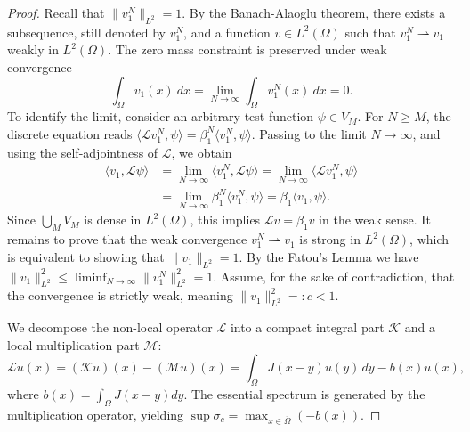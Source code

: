 \documentclass[11pt, a4paper]{article}
\theoremstyle{break}
\theoremstyle{break}
\theoremstyle{break}
\theoremstyle{break}
\theoremstyle{break}
\theoremstyle{break}
\theoremstyle{break}
\theoremstyle{break}
\theoremstyle{break}
\begin{document}
\begin{proof}
    Recall that $\|v_1^N\|_{L^2} = 1$. By the Banach-Alaoglu theorem, there exists a subsequence, still denoted by $v_1^N$, and a function $v \in L^2(\Omega)$ such that $v_1^N \rightharpoonup v_1$ weakly in $L^2(\Omega)$. The zero mass constraint is preserved under weak convergence
    \begin{equation}
        \int_\Omega v_1(x) \:dx = \lim_{N \to \infty} \int_\Omega v_1^N(x) \:dx = 0.
    \end{equation}
    To identify the limit, consider an arbitrary test function $\psi \in V_M$. For $N \geq M$, the discrete equation reads $\langle \mathcal{L} v_1^N, \psi \rangle = \beta_1^N \langle v_1^N, \psi \rangle$. Passing to the limit $N \to \infty$, and using the self-adjointness of $\mathcal{L}$, we obtain
    \begin{align}
        \langle v_1, \mathcal{L} \psi \rangle &= \lim_{N \to \infty} \langle v_1^N, \mathcal{L} \psi \rangle = \lim_{N \to \infty} \langle \mathcal{L} v_1^N, \psi \rangle \\
        &= \lim_{N \to \infty} \beta_1^N \langle v_1^N, \psi \rangle = \beta_1 \langle v_1, \psi \rangle.
    \end{align}
    Since $\bigcup_{M} V_M$ is dense in $L^2(\Omega)$, this implies $\mathcal{L} v = \beta_1 v$ in the weak sense.
    It remains to prove that the weak convergence $v_1^N \rightharpoonup v_1$ is strong in $L^2(\Omega)$, which is equivalent to showing that $\|v_1\|_{L^2} = 1$. By the Fatou's Lemma we have $\|v_1\|_{L^2}^2 \leq \liminf_{N \to \infty} \|v_1^N\|_{L^2}^2 = 1$. 
    Assume, for the sake of contradiction, that the convergence is strictly weak, meaning $\|v_1\|_{L^2}^2 =: c < 1$. 
    
    We decompose the non-local operator $\mathcal{L}$ into a compact integral part $\mathcal{K}$ and a local multiplication part $\mathcal{M}$:
    \begin{equation}
        \mathcal{L}u(x) = (\mathcal{K}u)(x) - (\mathcal{M}u)(x) = \int_\Omega J(x-y)u(y)\,dy - b(x)u(x),
    \end{equation}
    where $b(x) = \int_\Omega J(x-y)dy$. The essential spectrum is generated by the multiplication operator, yielding $\sup \sigma_c = \max_{x \in \overline{\Omega}} (-b(x))$.
    

\end{proof}
\end{document}

